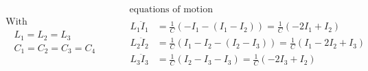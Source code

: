 \documentclass[twoside,10pt]{amsart}
\begin{document}
\[
\begin{gathered}
\text{ With } \\
\begin{aligned}
  & L_1  = L_2 = L_3 \\
  & C_1 = C_2 = C_3 = C_4 
\end{aligned} 
\end{gathered} \quad \quad 
\begin{gathered}
\text{ equations of motion } \\
\begin{aligned}
  L_1 \ddot{I}_1 & = \frac{1}{C} ( - I_1 - (I_1 - I_2)  ) = \frac{1}{C} ( -2I_1 + I_2 ) \\
  L_2 \ddot{I}_2 & = \frac{1}{C} ( I_1 - I_2 - (I_2 - I_3) ) = \frac{1}{C} ( I_1 - 2I_2 + I_3 ) \\
  L_3 \ddot{I}_3 & = \frac{1}{C} (I_2 - I_3 - I_3 ) = \frac{1}{C} ( -2I_3 + I_2 ) 
\end{aligned}
\end{gathered}
\]
\end{document}
